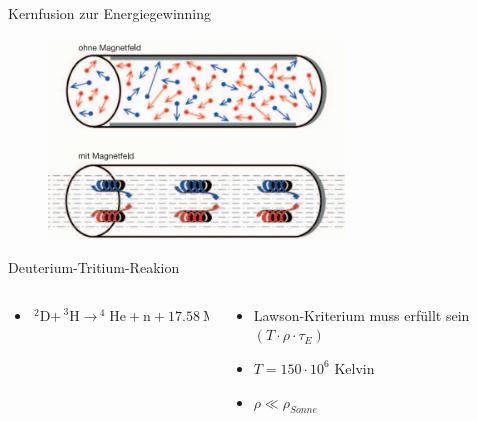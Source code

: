 \documentclass[aspectratio=169,xcolor=dvipsnames,14pt]{beamer}
\begin{document}
\begin{frame}{Kernfusion zur Energiegewinning}
    \begin{figure}
        \centering
        \includegraphics[width=0.7\textwidth]{Images/PlasmaImMagnetfeld.png}
    \end{figure}
\end{frame}
    
    \begin{frame}{Deuterium-Tritium-Reakion}
        \begin{columns}
            \begin{column}{0.7\textwidth}
                \begin{itemize}
                    \color{LightGrey}
                    \item
                    \begin{math} 
                            {\displaystyle \mathrm {_{\ }^{\ 2}D+_{\ }^{\ 3}H\to _{\ }^{\ 4}He+n + 17.58 \ MeV}}
                    \end{math}
                \end{itemize}
            \end{column}

            \begin{column}{0.3\textwidth}
                \begin{itemize}
                \color{LightGrey}
                    \item Lawson-Kriterium muss erfüllt sein $(T\cdot\rho\cdot\tau _{E})$
                    \item $T = 150\cdot{10}^{6}$ Kelvin
                    \item $\rho \ll \rho_{Sonne}$
                \end{itemize}
            \end{column}

        \end{columns}
    \end{frame}
\end{document}
